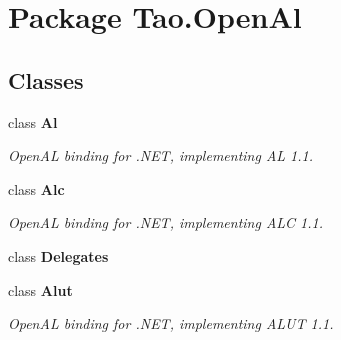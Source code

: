 \hypertarget{namespace_tao_1_1_open_al}{
\section{Package Tao.OpenAl}
\label{namespace_tao_1_1_open_al}
}
\subsection*{Classes}
\begin{DoxyCompactItemize}
\item 
class {\bfseries Al}
\begin{DoxyCompactList}\small\item\em OpenAL binding for .NET, implementing AL 1.1. \item\end{DoxyCompactList}\item 
class {\bfseries Alc}
\begin{DoxyCompactList}\small\item\em OpenAL binding for .NET, implementing ALC 1.1. \item\end{DoxyCompactList}\item 
class {\bfseries Delegates}
\item 
class {\bfseries Alut}
\begin{DoxyCompactList}\small\item\em OpenAL binding for .NET, implementing ALUT 1.1. \item\end{DoxyCompactList}\end{DoxyCompactItemize}
